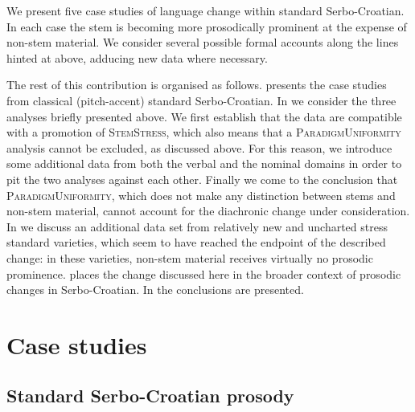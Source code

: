 \documentclass[output=paper,modfonts,nonflat
]{langsci/langscibook}
\begin{document}
We present five case studies of language change within standard Serbo-Croatian. In each case the stem is becoming more prosodically prominent at the expense of non-stem material. We consider several possible formal accounts along the lines hinted at above, adducing new data where necessary.

The rest of this contribution is organised as follows.  presents the case studies from classical (pitch-accent) standard Serbo-Croatian. In   we consider the three analyses briefly presented above. We first establish that the data are compatible with a promotion of \textsc{StemStress}, which also means that a \textsc{ParadigmUniformity} analysis cannot be excluded, as discussed above. For this reason, we introduce some additional data from both the verbal and the nominal domains in order to pit the two analyses against each other. Finally we come to the conclusion that \textsc{ParadigmUniformity}, which does not make any distinction between stems and non-stem material, cannot account for the diachronic change under consideration. In  we discuss an additional data set from relatively new and uncharted stress standard varieties, which seem to have reached the endpoint of the described change: in these varieties, non-stem material receives virtually no prosodic prominence.  places the change discussed here in the broader context of prosodic changes in Serbo-Croatian. In  the conclusions are presented. 

\section{Case studies} \label{sec:kager:2}
\subsection{Standard Serbo-Croatian prosody} \label{sec:kager:subsec21}
\end{document}
